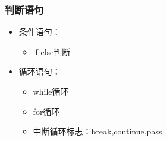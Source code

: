 \documentclass[11pt]{beamer}
\begin{document}
\begin{frame}[fragile]
	\frametitle{判断语句}
	\begin{minipage}[t]{0.5\linewidth}
		\begin{itemize}
			\item	条件语句：
			      \begin{itemize}
				      \item if else判断
			      \end{itemize}
			\item 循环语句：
			      \begin{itemize}
				      \item while循环
				      \item for循环
				      \item 中断循环标志：break,continue,pass
			      \end{itemize}
		\end{itemize}
	

\end{minipage}
\end{frame}
\end{document}
